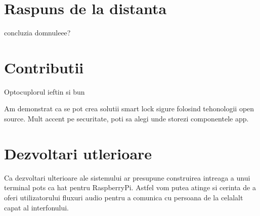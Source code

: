\section{Raspuns de la distanta}

concluzia domnuleee?

\section{Contributii}

Optocuplorul ieftin si bun

Am demonstrat ca se pot crea solutii smart lock sigure folosind tehonologii open source. Mult accent pe securitate, poti sa alegi unde storezi componentele app.

\section{Dezvoltari utlerioare}

Ca dezvoltari ulterioare ale sistemului ar presupune construirea intreaga a unui terminal \acrshort{pots} ca \acrshort{hat} pentru RaspberryPi. Astfel vom putea atinge si cerinta de a oferi utilizatorului fluxuri audio pentru a comunica cu persoana de la celalalt capat al interfonului. 
